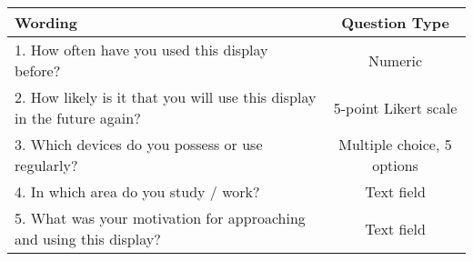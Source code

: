 \begin{tabular}{lc}
\textbf{Wording}                                                     & \textbf{Question Type} \\ \hline
1. How often have you used this display before?                         & Numeric                \\
2. How likely is it that you will use this display in the future again? & 5-point Likert scale   \\
3. Which devices do you possess or use regularly?                       & Multiple choice, 5 options                        \\
4. In which area do you study / work?                                   & Text field             \\
5. What was your motivation for approaching and using this display?     & Text field            
\end{tabular}
